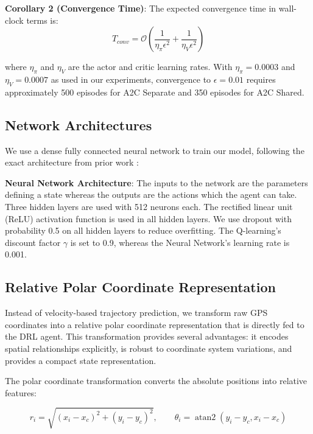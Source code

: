 \documentclass[10pt,twocolumn]{article}
\begin{document}
\textbf{Corollary 2 (Convergence Time)}: The expected convergence time
in wall-clock terms is:
\[T_{conv} = \mathcal{O}\left(\frac{1}{\eta_\pi \epsilon^2} + \frac{1}{\eta_V \epsilon^2}\right)\]

where \(\eta_\pi\) and \(\eta_V\) are the actor and critic learning
rates. With \(\eta_\pi = 0.0003\) and \(\eta_V = 0.0007\) as used in our
experiments, convergence to \(\epsilon = 0.01\) requires approximately
500 episodes for A2C Separate and 350 episodes for A2C Shared.

\subsection{Network Architectures}\label{network-architectures}

We use a dense fully connected neural network to train our model, following the exact architecture from prior work \cite{neiat2021}:

\textbf{Neural Network Architecture}: The inputs to the network are the parameters defining a state whereas the outputs are the actions which the agent can take. Three hidden layers are used with 512 neurons each. The rectified linear unit (ReLU) activation function is used in all hidden layers. We use dropout with probability 0.5 on all hidden layers to reduce overfitting. The Q-learning's discount factor $\gamma$ is set to 0.9, whereas the Neural Network's learning rate is 0.001.

\subsection{Relative Polar Coordinate Representation}\label{relative-polar-coordinate-representation}

Instead of velocity-based trajectory prediction, we transform raw GPS
coordinates into a relative polar coordinate representation that is
directly fed to the DRL agent. This transformation provides several
advantages: it encodes spatial relationships explicitly, is robust to
coordinate system variations, and provides a compact state
representation.

The polar coordinate transformation converts the absolute positions
into relative features:

\begin{equation*}
	r_i = \sqrt{(x_i - x_c)^2 + (y_i - y_c)^2}, \qquad
	\theta_i = \operatorname{atan2}(y_i - y_c, x_i - x_c)
\end{equation*}
\end{document}

